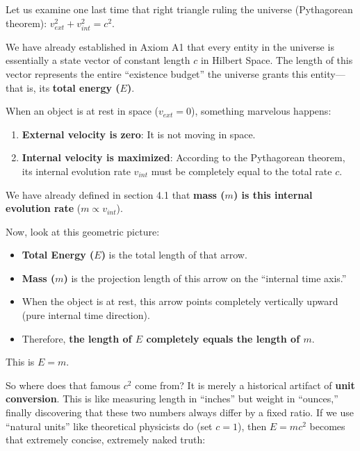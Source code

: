 \documentclass[11pt,a4paper,twoside]{book}
\begin{document}
Let us examine one last time that right triangle ruling the universe (Pythagorean theorem): $v_{ext}^2 + v_{int}^2 = c^2$.

We have already established in Axiom A1 that every entity in the universe is essentially a state vector of constant length $c$ in Hilbert Space. The length of this vector represents the entire ``existence budget'' the universe grants this entity---that is, its \textbf{total energy ($E$)}.

When an object is at rest in space ($v_{ext} = 0$), something marvelous happens:

\begin{enumerate}
\item \textbf{External velocity is zero}: It is not moving in space.

\item \textbf{Internal velocity is maximized}: According to the Pythagorean theorem, its internal evolution rate $v_{int}$ must be completely equal to the total rate $c$.
\end{enumerate}

We have already defined in section 4.1 that \textbf{mass ($m$) is this internal evolution rate} ($m \propto v_{int}$).

Now, look at this geometric picture:

\begin{itemize}
\item \textbf{Total Energy ($E$)} is the total length of that arrow.

\item \textbf{Mass ($m$)} is the projection length of this arrow on the ``internal time axis.''

\item When the object is at rest, this arrow points completely vertically upward (pure internal time direction).

\item Therefore, \textbf{the length of $E$ completely equals the length of $m$}.
\end{itemize}

This is $E=m$.

So where does that famous $c^2$ come from? It is merely a historical artifact of \textbf{unit conversion}. This is like measuring length in ``inches'' but weight in ``ounces,'' finally discovering that these two numbers always differ by a fixed ratio. If we use ``natural units'' like theoretical physicists do (set $c=1$), then $E=mc^2$ becomes that extremely concise, extremely naked truth:
\end{document}
